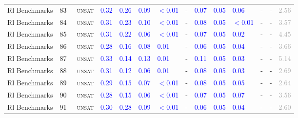 \begin{center}
{\begin{longtable}{@{}llllllllllllll@{}}
Rl Benchmarks & 83 & ~\textsc{unsat} & \textcolor{blue}{0.32} & \textcolor{blue}{0.26} & \textcolor{blue}{0.09} & \textcolor{blue}{$<$0.01} & - & \textcolor{blue}{0.07} & \textcolor{blue}{0.05} & \textcolor{blue}{0.06} & - & - & \textcolor{darkgray}{2.56} \\
Rl Benchmarks & 84 & ~\textsc{unsat} & \textcolor{blue}{0.31} & \textcolor{blue}{0.23} & \textcolor{blue}{0.10} & \textcolor{blue}{$<$0.01} & - & \textcolor{blue}{0.08} & \textcolor{blue}{0.05} & \textcolor{blue}{$<$0.01} & - & - & \textcolor{darkgray}{3.57} \\
Rl Benchmarks & 85 & ~\textsc{unsat} & \textcolor{blue}{0.31} & \textcolor{blue}{0.22} & \textcolor{blue}{0.06} & \textcolor{blue}{$<$0.01} & - & \textcolor{blue}{0.07} & \textcolor{blue}{0.05} & \textcolor{blue}{0.02} & - & - & \textcolor{darkgray}{4.45} \\
Rl Benchmarks & 86 & ~\textsc{unsat} & \textcolor{blue}{0.28} & \textcolor{blue}{0.16} & \textcolor{blue}{0.08} & \textcolor{blue}{0.01} & - & \textcolor{blue}{0.06} & \textcolor{blue}{0.05} & \textcolor{blue}{0.04} & - & - & \textcolor{darkgray}{3.66} \\
Rl Benchmarks & 87 & ~\textsc{unsat} & \textcolor{blue}{0.33} & \textcolor{blue}{0.14} & \textcolor{blue}{0.13} & \textcolor{blue}{0.01} & - & \textcolor{blue}{0.11} & \textcolor{blue}{0.05} & \textcolor{blue}{0.03} & - & - & \textcolor{darkgray}{5.14} \\
Rl Benchmarks & 88 & ~\textsc{unsat} & \textcolor{blue}{0.31} & \textcolor{blue}{0.12} & \textcolor{blue}{0.06} & \textcolor{blue}{0.01} & - & \textcolor{blue}{0.08} & \textcolor{blue}{0.05} & \textcolor{blue}{0.03} & - & - & \textcolor{darkgray}{2.69} \\
Rl Benchmarks & 89 & ~\textsc{unsat} & \textcolor{blue}{0.29} & \textcolor{blue}{0.15} & \textcolor{blue}{0.07} & \textcolor{blue}{$<$0.01} & - & \textcolor{blue}{0.08} & \textcolor{blue}{0.05} & \textcolor{blue}{0.05} & - & - & \textcolor{darkgray}{2.64} \\
Rl Benchmarks & 90 & ~\textsc{unsat} & \textcolor{blue}{0.28} & \textcolor{blue}{0.15} & \textcolor{blue}{0.06} & \textcolor{blue}{$<$0.01} & - & \textcolor{blue}{0.07} & \textcolor{blue}{0.05} & \textcolor{blue}{0.07} & - & - & \textcolor{darkgray}{3.56} \\
Rl Benchmarks & 91 & ~\textsc{unsat} & \textcolor{blue}{0.30} & \textcolor{blue}{0.28} & \textcolor{blue}{0.09} & \textcolor{blue}{$<$0.01} & - & \textcolor{blue}{0.06} & \textcolor{blue}{0.05} & \textcolor{blue}{0.04} & - & - & \textcolor{darkgray}{2.60} \\

\end{longtable}}
\end{center}
